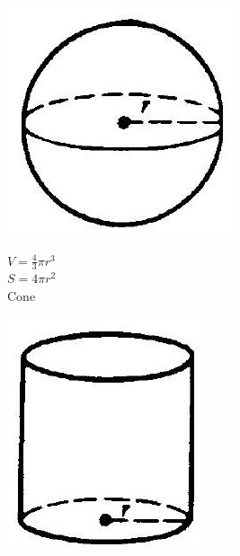 \documentclass[10pt]{article}
\begin{document}
\begin{center}
\includegraphics[max width=\textwidth]{2024_04_20_fe2e8e718cc0fcd63d1bg-30(3)}
\end{center}

$V=\frac{4}{3} \pi r^{3}$\\
$S=4 \pi r^{2}$\\
Cone

\begin{center}
\includegraphics[max width=\textwidth]{2024_04_20_fe2e8e718cc0fcd63d1bg-30}
\end{center}
\end{document}
